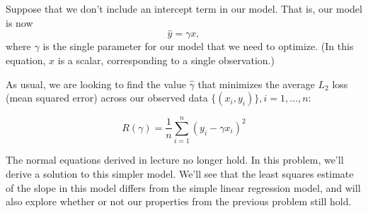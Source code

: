 \documentclass[addpoints, 12pt]{exam}
\theoremstyle{definition}
\begin{document}
\newpage

\noindent Suppose that we don't include an intercept term in
our model. That is, our model is now
$$\hat{y} = \gamma x,$$
where $\gamma$ is the single parameter for our model that we need to optimize. (In this equation, $x$ is a scalar, corresponding to a single observation.)

\noindent As usual, we are looking to find the value $\hat{\gamma}$ that minimizes the average $L_2$ loss (mean squared error) across our observed data $\{(x_i, y_i)\}, i = 1, \ldots, n$:

$$R(\gamma) = \frac{1}{n}\sum_{i=1}^n (y_i - \gamma x_i)^2$$

\noindent The normal equations derived in lecture no longer hold. In this problem, we'll derive a solution to this simpler model. We'll see that the least squares estimate of the slope in this model differs from the simple linear regression model, and will also explore whether or not our properties from the previous problem still hold.
\end{document}
